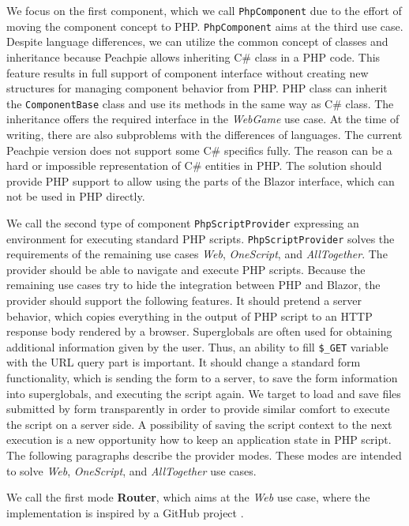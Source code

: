 \par
We focus on the first component, which we call \texttt{PhpComponent} due to the effort of moving the component concept to PHP.
\texttt{PhpComponent} aims at the third use case.
Despite language differences, we can utilize the common concept of classes and inheritance because Peachpie allows inheriting C\# class in a PHP code.
This feature results in full support of component interface without creating new structures for managing component behavior from PHP.
PHP class can inherit the \texttt{ComponentBase} class and use its methods in the same way as C\# class.
The inheritance offers the required interface in the \textit{WebGame} use case.
At the time of writing, there are also subproblems with the differences of languages.
The current Peachpie version does not support some C\# specifics fully.
The reason can be a hard or impossible representation of C\# entities in PHP.
The solution should provide PHP support to allow using the parts of the Blazor interface, which can not be used in PHP directly.
\par
We call the second type of component \texttt{PhpScriptProvider} expressing an environment for executing standard PHP scripts.
\texttt{PhpScriptProvider} solves the requirements of the remaining use cases \textit{Web}, \textit{OneScript}, and \textit{AllTogether}.
The provider should be able to navigate and execute PHP scripts.
Because the remaining use cases try to hide the integration between PHP and Blazor, the provider should support the following features.
It should pretend a server behavior, which copies everything in the output of PHP script to an HTTP response body rendered by a browser.
Superglobals are often used for obtaining additional information given by the user.
Thus, an ability to fill \texttt{\$\_GET} variable with the URL query part is important.
It should change a standard form functionality, which is sending the form to a server, to save the form information into superglobals, and executing the script again.
We target to load and save files submitted by form transparently in order to provide similar comfort to execute the script on a server side.
A possibility of saving the script context to the next execution is a new opportunity how to keep an application state in PHP script.
The following paragraphs describe the provider modes.
These modes are intended to solve \textit{Web}, \textit{OneScript}, and \textit{AllTogether} use cases. 
\par
We call the first mode \textbf{Router}, which aims at the \textit{Web} use case, where the implementation is inspired by a GitHub project \cite{online:customRouter}.
